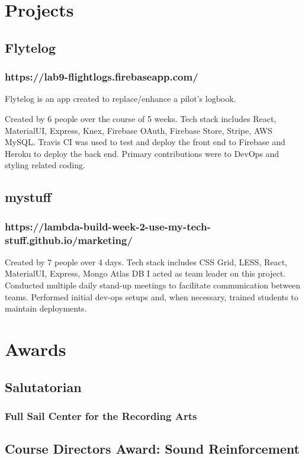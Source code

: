 \documentclass{article}
\begin{document}
\section{Projects}
\subsection{Flytelog}
\subsubsection{https://lab9-flightlogs.firebaseapp.com/}
Flytelog is an app created to replace/enhance a pilot's logbook.

Created by 6 people over the course of 5 weeks.
Tech stack includes React, MaterialUI, Express, Knex, Firebase OAuth, Firebase Store, Stripe, AWS MySQL.
Travis CI was used to test and deploy the front end to Firebase and Heroku to deploy the back end.
Primary contributions were to DevOps and styling related coding.

\subsection{mystuff}
\subsubsection{https://lambda-build-week-2-use-my-tech-stuff.github.io/marketing/}

Created by 7 people over 4 days.
Tech stack includes CSS Grid, LESS, React, MaterialUI, Express, Mongo Atlas DB
I acted as team leader on this project.
Conducted multiple daily stand-up meetings to facilitate communication between teams.
Performed initial dev-ops setups and, when necessary, trained students to maintain deployments.



\section{Awards}
\subsection{Salutatorian}
\subsubsection{Full Sail Center for the Recording Arts}

\subsection{Course Directors Award: Sound Reinforcement}
\end{document}

